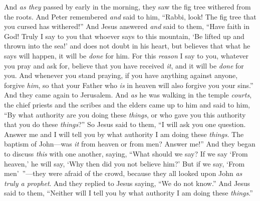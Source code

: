 \begin{biblechapter}
 And \textit{as they} passed by early in the morning, they saw the fig tree withered from the roots.
\verse And Peter remembered \textit{and} said to him, “Rabbi, look! The fig tree that you cursed has withered!”
\verse And Jesus answered \textit{and} said to them, “Have faith in God!
\verse Truly I say to you that whoever says to this mountain, ‘Be lifted up and thrown into the sea!’ and does not doubt in his heart, but believes that what he says will happen, it will be \textit{done} for him.
\verse For this \textit{reason} I say to you, whatever you pray and ask for, believe that you have received \textit{it}, and it will be \textit{done} for you.
\verse And whenever you stand praying, if you have anything against anyone, forgive \textit{him}, so that your Father who \textit{is} in heaven will also forgive you your sins.”
 And they came again to Jerusalem. And \textit{as} he was walking in the temple \textit{courts}, the chief priests and the scribes and the elders came up to him
\verse and said to him, “By what authority are you doing these \textit{things}, or who gave you this authority that you do these \textit{things}?”
\verse So Jesus said to them, “I will ask you one question. Answer me and I will tell you by what authority I am doing these \textit{things}.
\verse The baptism of John—was \textit{it} from heaven or from men? Answer me!”
\verse And they began to discuss \textit{this} with one another, saying, “What should we say? If we say ‘From heaven,’ he will say, ‘Why then did you not believe him?’
\verse But if we say, ‘From men’ ”—they were afraid of the crowd, because they all looked upon John \textit{as truly a prophet}.
\verse And they replied to Jesus saying, “We do not know.” And Jesus said to them, “Neither will I tell you by what authority I am doing these \textit{things}.”
\end{biblechapter}

